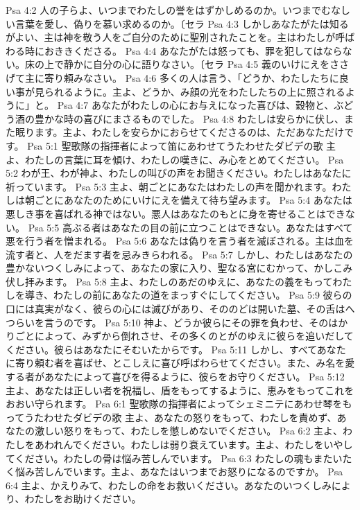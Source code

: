 Psa 4:2  人の子らよ、いつまでわたしの誉をはずかしめるのか。いつまでむなしい言葉を愛し、偽りを慕い求めるのか。〔セラ
Psa 4:3  しかしあなたがたは知るがよい、主は神を敬う人をご自分のために聖別されたことを。主はわたしが呼ばわる時におききくださる。
Psa 4:4  あなたがたは怒っても、罪を犯してはならない。床の上で静かに自分の心に語りなさい。〔セラ
Psa 4:5  義のいけにえをささげて主に寄り頼みなさい。
Psa 4:6  多くの人は言う、「どうか、わたしたちに良い事が見られるように。主よ、どうか、み顔の光をわたしたちの上に照されるように」と。
Psa 4:7  あなたがわたしの心にお与えになった喜びは、穀物と、ぶどう酒の豊かな時の喜びにまさるものでした。
Psa 4:8  わたしは安らかに伏し、また眠ります。主よ、わたしを安らかにおらせてくださるのは、ただあなただけです。
Psa 5:1  聖歌隊の指揮者によって笛にあわせてうたわせたダビデの歌 主よ、わたしの言葉に耳を傾け、わたしの嘆きに、み心をとめてください。
Psa 5:2  わが王、わが神よ、わたしの叫びの声をお聞きください。わたしはあなたに祈っています。
Psa 5:3  主よ、朝ごとにあなたはわたしの声を聞かれます。わたしは朝ごとにあなたのためにいけにえを備えて待ち望みます。
Psa 5:4  あなたは悪しき事を喜ばれる神ではない。悪人はあなたのもとに身を寄せることはできない。
Psa 5:5  高ぶる者はあなたの目の前に立つことはできない。あなたはすべて悪を行う者を憎まれる。
Psa 5:6  あなたは偽りを言う者を滅ぼされる。主は血を流す者と、人をだます者を忌みきらわれる。
Psa 5:7  しかし、わたしはあなたの豊かないつくしみによって、あなたの家に入り、聖なる宮にむかって、かしこみ伏し拝みます。
Psa 5:8  主よ、わたしのあだのゆえに、あなたの義をもってわたしを導き、わたしの前にあなたの道をまっすぐにしてください。
Psa 5:9  彼らの口には真実がなく、彼らの心には滅びがあり、そののどは開いた墓、その舌はへつらいを言うのです。
Psa 5:10  神よ、どうか彼らにその罪を負わせ、そのはかりごとによって、みずから倒れさせ、その多くのとがのゆえに彼らを追いだしてください。彼らはあなたにそむいたからです。
Psa 5:11  しかし、すべてあなたに寄り頼む者を喜ばせ、とこしえに喜び呼ばわらせてください。また、み名を愛する者があなたによって喜びを得るように、彼らをお守りください。
Psa 5:12  主よ、あなたは正しい者を祝福し、盾をもってするように、恵みをもってこれをおおい守られます。
Psa 6:1  聖歌隊の指揮者によってシェミニテにあわせ琴をもってうたわせたダビデの歌 主よ、あなたの怒りをもって、わたしを責めず、あなたの激しい怒りをもって、わたしを懲しめないでください。
Psa 6:2  主よ、わたしをあわれんでください。わたしは弱り衰えています。主よ、わたしをいやしてください。わたしの骨は悩み苦しんでいます。
Psa 6:3  わたしの魂もまたいたく悩み苦しんでいます。主よ、あなたはいつまでお怒りになるのですか。
Psa 6:4  主よ、かえりみて、わたしの命をお救いください。あなたのいつくしみにより、わたしをお助けください。
